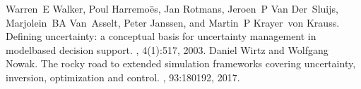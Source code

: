 \documentclass[letterpaper,10pt,english]{sphinxmanual}
\begin{document}
\begin{sphinxthebibliography}{10}
\sphinxAtStartPar
Warren E Walker, Poul Harremoës, Jan Rotmans, Jeroen P Van Der Sluijs, Marjolein BA Van Asselt, Peter Janssen, and Martin P Krayer von Krauss. Defining uncertainty: a conceptual basis for uncertainty management in model\sphinxhyphen{}based decision support. , 4(1):5\textendash{}17, 2003.
\sphinxAtStartPar
Daniel Wirtz and Wolfgang Nowak. The rocky road to extended simulation frameworks covering uncertainty, inversion, optimization and control. , 93:180\textendash{}192, 2017.
\end{sphinxthebibliography}



\renewcommand{\indexname}{Index}
\printindex
\end{document}
